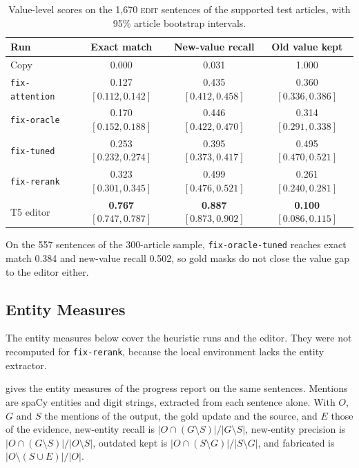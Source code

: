 \documentclass[]{paper}
\newcommand{\edit}{\textsc{edit}}
\newcommand{\run}[1]{\texttt{#1}}
\begin{document}
\begin{table}[H]
\caption{Value-level scores on the 1,670 \edit{} sentences of the supported test articles, with 95\% article bootstrap intervals.}
\label{tab:values}
\centering
\footnotesize
\begin{tabular}{lccc}
\toprule
Run & Exact match & New-value recall & Old value kept \\
\midrule
Copy & 0.000 & 0.031 & 1.000 \\
\run{fix-attention} & 0.127 $[0.112, 0.142]$ & 0.435 $[0.412, 0.458]$ & 0.360 $[0.336, 0.386]$ \\
\run{fix-oracle} & 0.170 $[0.152, 0.188]$ & 0.446 $[0.422, 0.470]$ & 0.314 $[0.291, 0.338]$ \\
\run{fix-tuned} & 0.253 $[0.232, 0.274]$ & 0.395 $[0.373, 0.417]$ & 0.495 $[0.470, 0.521]$ \\
\run{fix-rerank} & 0.323 $[0.301, 0.345]$ & 0.499 $[0.476, 0.521]$ & 0.261 $[0.240, 0.281]$ \\
T5 editor & \textbf{0.767} $[0.747, 0.787]$ & \textbf{0.887} $[0.873, 0.902]$ & \textbf{0.100} $[0.086, 0.115]$ \\
\bottomrule
\end{tabular}
\end{table}

On the 557 sentences of the 300-article sample, \run{fix-oracle-tuned} reaches exact match 0.384 and new-value recall 0.502, so gold masks do not close the value gap to the editor either.

\subsection{Entity Measures}

The entity measures below cover the heuristic runs and the editor. They were not recomputed for \run{fix-rerank}, because the local environment lacks the entity extractor.

 gives the entity measures of the progress report on the same sentences. Mentions are spaCy entities and digit strings, extracted from each sentence alone. With $O$, $G$ and $S$ the mentions of the output, the gold update and the source, and $E$ those of the evidence, new-entity recall is $|O \cap (G \setminus S)| / |G \setminus S|$, new-entity precision is $|O \cap (G \setminus S)| / |O \setminus S|$, outdated kept is $|O \cap (S \setminus G)| / |S \setminus G|$, and fabricated is $|O \setminus (S \cup E)| / |O|$.
\end{document}

